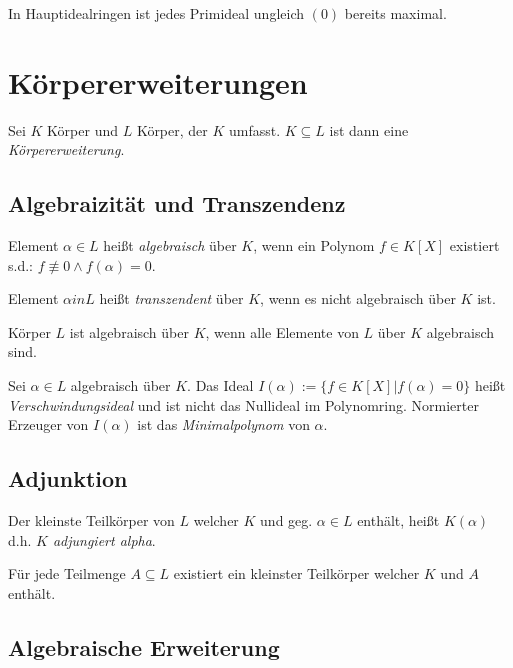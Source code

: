 \vspace*{1mm}

In Hauptidealringen ist jedes Primideal ungleich $(0)$ bereits maximal.

\section*{Körpererweiterungen}

Sei $K$ Körper und $L$ Körper, der $K$ umfasst. $K \subseteq L$ ist dann eine \emph{Körpererweiterung}.

\subsection*{Algebraizität und Transzendenz}

Element $\alpha \in L$ heißt \emph{algebraisch} über $K$, wenn ein Polynom $f \in K[X]$ existiert s.d.: $f \not\equiv 0 \land f(\alpha) = 0$.

\vspace*{1mm}

Element $\alpha in L$ heißt \emph{transzendent} über $K$, wenn es nicht algebraisch über $K$ ist.

\vspace*{1mm}

Körper $L$ ist algebraisch über $K$, wenn alle Elemente von $L$ über $K$ algebraisch sind.

\vspace*{1mm}

Sei $\alpha \in L$ algebraisch über $K$. Das Ideal $I(\alpha) := \{f \in K[X] | f(\alpha) = 0\}$ heißt \emph{Verschwindungsideal} und ist nicht das Nullideal im Polynomring. Normierter Erzeuger von $I(\alpha)$ ist das \emph{Minimalpolynom} von $\alpha$.

\subsection*{Adjunktion}

Der kleinste Teilkörper von $L$ welcher $K$ und geg. $\alpha \in L$ enthält, heißt $K(\alpha)$ d.h. \emph{$K$ adjungiert alpha}.

Für jede Teilmenge $A \subseteq L$ existiert ein kleinster Teilkörper welcher $K$ und $A$ enthält.

\subsection*{Algebraische Erweiterung}

